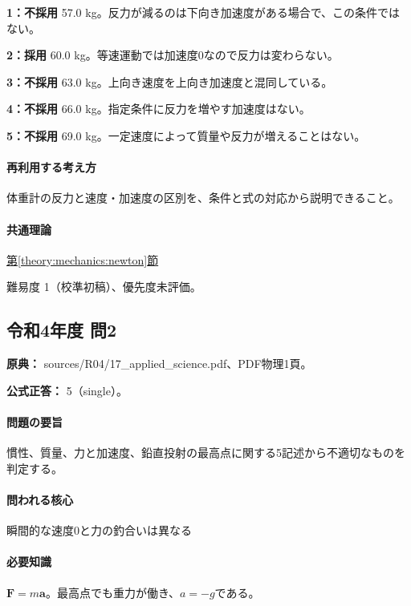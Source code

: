 \noindent\textbf{1：不採用} 57.0 kg。反力が減るのは下向き加速度がある場合で、この条件ではない。\par

\noindent\textbf{2：採用} 60.0 kg。等速運動では加速度0なので反力は変わらない。\par

\noindent\textbf{3：不採用} 63.0 kg。上向き速度を上向き加速度と混同している。\par

\noindent\textbf{4：不採用} 66.0 kg。指定条件に反力を増やす加速度はない。\par

\noindent\textbf{5：不採用} 69.0 kg。一定速度によって質量や反力が増えることはない。\par

\paragraph{再利用する考え方} 体重計の反力と速度・加速度の区別を、条件と式の対応から説明できること。

\paragraph{共通理論} \hyperref[theory:mechanics:newton]{第\ref*{theory:mechanics:newton}節}

\par 難易度 1（校準初稿）、優先度未評価。

\subsection{令和4年度 問2}
\label{q:r04-reg-applied-02}

\noindent\textbf{原典：} sources/R04/17\_applied\_science.pdf、PDF物理1頁。

\textbf{公式正答：} 5（single）。

\paragraph{問題の要旨} 慣性、質量、力と加速度、鉛直投射の最高点に関する5記述から不適切なものを判定する。

\paragraph{問われる核心} 瞬間的な速度0と力の釣合いは異なる

\paragraph{必要知識} \(\mathbf F=m\mathbf a\)。最高点でも重力が働き、\(a=-g\)である。

